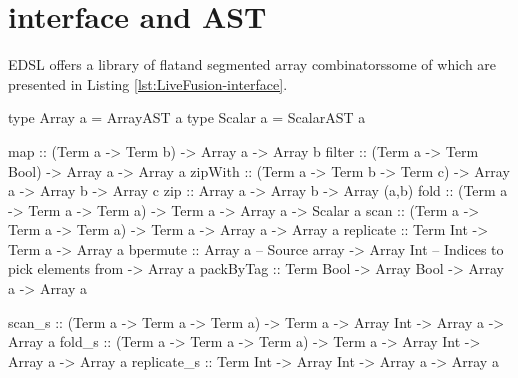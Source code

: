 \documentclass[preamble.tex]{subfiles}
\begin{document}

\section{\LiveFusion interface and AST}

\LiveFusion EDSL offers a library of flat\iflatcomb and segmented array combinators\isegcomb some of which are presented in Listing \ref{lst:LiveFusion-interface}.

\begin{hscode2}[%
    caption={\LiveFusion interface functions. Typeclass constraints on array elements have been omitted for brevity.},%
    label=lst:LiveFusion-interface,%
]
type Array  a = ArrayAST  a
type Scalar a = ScalarAST a

map      :: (Term a -> Term b) -> Array a -> Array b
filter   :: (Term a -> Term Bool) -> Array a -> Array a
zipWith  :: (Term a -> Term b -> Term c) -> Array a -> Array b -> Array c
zip      :: Array a -> Array b -> Array (a,b)
fold     :: (Term a -> Term a -> Term a) -> Term a -> Array a -> Scalar a
scan     :: (Term a -> Term a -> Term a) -> Term a -> Array a -> Array a
replicate :: Term Int -> Term a -> Array a
bpermute :: Array a      -- Source array
         -> Array Int    -- Indices to pick elements from
         -> Array a
packByTag :: Term Bool -> Array Bool -> Array a -> Array a

scan_s   :: (Term a -> Term a -> Term a) -> Term a
         -> Array Int -> Array a -> Array a
fold_s   :: (Term a -> Term a -> Term a) -> Term a
         -> Array Int -> Array a -> Array a
replicate_s :: Term Int -> Array Int -> Array a -> Array a
\end{hscode2}
\end{document}
